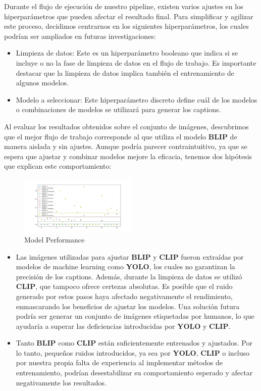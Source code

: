 \documentclass[14pt]{extarticle}
\begin{document}
Durante el flujo de ejecución de nuestro pipeline, existen varios ajustes en los hiperparámetros que pueden afectar el resultado final. Para simplificar y agilizar este proceso, decidimos centrarnos en los siguientes hiperparámetros, los cuales podrían ser ampliados en futuras investigaciones:
\begin{itemize}
    \item Limpieza de datos: Este es un hiperparámetro booleano que indica si se incluye o no la fase de limpieza de datos en el flujo de trabajo. Es importante destacar que la limpieza de datos implica también el entrenamiento de algunos modelos.
    \item Modelo a seleccionar: Este hiperparámetro discreto define cuál de los modelos o combinaciones de modelos se utilizará para generar los captions.
\end{itemize}

Al evaluar los resultados obtenidos sobre el conjunto de imágenes, descubrimos que el mejor flujo de trabajo corresponde al que utiliza el modelo \textbf{BLIP} de manera aislada y sin ajustes. Aunque podría parecer contraintuitivo, ya que se espera que ajustar y combinar modelos mejore la eficacia, tenemos dos hipótesis que explican este comportamiento:

\begin{figure}[h]
    \centering
    \includegraphics[width=0.5\textwidth]{./images/Figure_1.png}
    \caption{Model Performance}
    \label{fig:performance}
\end{figure}

\begin{itemize}
    \item Las imágenes utilizadas para ajustar \textbf{BLIP} y \textbf{CLIP} fueron extraídas por modelos de machine learning como \textbf{YOLO}, los cuales no garantizan la precisión de los captions. Además, durante la limpieza de datos se utilizó \textbf{CLIP}, que tampoco ofrece certezas absolutas. Es posible que el ruido generado por estos pasos haya afectado negativamente el rendimiento, enmascarando los beneficios de ajustar los modelos. Una solución futura podría ser generar un conjunto de imágenes etiquetadas por humanos, lo que ayudaría a superar las deficiencias introducidas por \textbf{YOLO} y \textbf{CLIP}.
    \item Tanto \textbf{BLIP} como \textbf{CLIP} están suficientemente entrenados y ajustados. Por lo tanto, pequeños ruidos introducidos, ya sea por \textbf{YOLO}, \textbf{CLIP} o incluso por nuestra propia falta de experiencia al implementar métodos de entrenamiento, podrían desestabilizar su comportamiento esperado y afectar negativamente los resultados.
\end{itemize}
\end{document}
